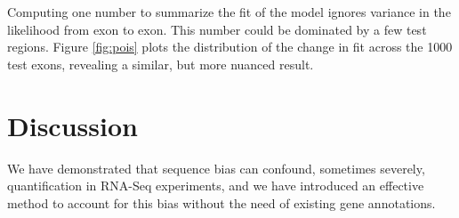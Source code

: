 \documentclass{bioinfo}
\begin{document}
\begin{comment}
\begin{tablehere}
\begin{center}
\tiny{
\begin{tabular}{lrrrrrr}
         &\textbf{Avg-7mer}&\textbf{7mer}&\textbf{4mer}&\textbf{GLM}&\textbf{MART}&\textbf{BN} \\
\textbf{Katze}            &  0.004  & 0.017  & 0.055 &0.166  &0.248&0.305 \\
\textbf{Wetterbom}        & -0.076  &-0.058  &-0.002 &0.240  &0.070&0.557 \\
\textbf{Bullard}          &  0.124  & 0.192  & 0.139 &0.285  &0.198&0.380 \\
\textbf{Mortazavi}        &  0.059  & 0.123  & 0.099 &0.284  &0.310&0.401 \\
\textbf{Trapnell}         &  0.094  & 0.163  & 0.104 &0.265  &0.332&0.349 \\
\end{tabular}
}
\end{center}
\caption{Change in fit, compared to the null model of uniform Poisson rate across exons.}
\label{tab:pois}
\end{tablehere}
\end{comment}

Computing one number to summarize the fit of the model ignores variance in the
likelihood from exon to exon. This number could be dominated by a few test
regions. Figure \ref{fig:pois} plots the distribution of the change in fit
across the 1000 test exons, revealing a similar, but more nuanced result.

\begin{comment}
\begin{figurehere}
\begin{center}
\texttt{[image: fig/pois.pdf]}
\end{center}
\caption{Plotted is the change in fit of each of the test exons. A
positive value indicates a better fit in the bias corrected model.}
\label{fig:pois}
\end{figurehere}
\end{comment}


\section{Discussion}

We have demonstrated that sequence bias can confound, sometimes severely,
quantification in RNA-Seq experiments, and we have introduced an effective
method to account for this bias without the need of existing gene annotations.
\end{document}
